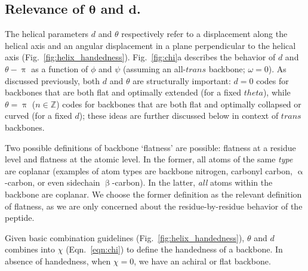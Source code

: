 \documentclass[fleqn,10pt]{wlpeerj} %
\newcommand{\Fig}[1]{Fig.~\ref{#1}}
\newcommand{\Eqn}[1]{Eqn.~\ref{#1}}
\newcommand\solidrule[1][1cm]{\rule[0.5ex]{#1}{0.2mm}}
\newcommand\dotdashedrule{\mbox{%
  \solidrule[1.5mm]\hspace{0.75mm}\solidrule[0.2mm]\hspace{0.75mm}\solidrule[1.5mm]}}
\newcommand\dashedrule{\mbox{%
  \solidrule[1.5mm]\hspace{0.75mm}\solidrule[1.5mm]}}
\newcommand{\figdir}{./figures}
\begin{document}
\subsection*{Relevance of $\bm \theta$ and $\bm d$.}
The helical parameters $d$ and $\theta$ respectively refer to a displacement along the helical axis and an angular displacement in a plane perpendicular to the helical axis (\Fig{fig:helix_handedness}).  \Fig{fig:chi}a describes the behavior of $d$ and $\theta-\uppi$ as a function of $\phi$ and $\psi$ (assuming an all-$trans$ backbone; $\omega=0$). 
As discussed previously, both $d$ and $\theta$ are structurally important: $d=0$ codes for backbones that are both flat and optimally extended (for a fixed $theta$), while $\theta=\uppi$ ($n\in\mathbb{Z}$) codes for backbones that are both flat and optimally collapsed or curved (for a fixed $d$); these ideas are further discussed below in context of $trans$ backbones. 

Two possible definitions of backbone `flatness' are possible: flatness at a residue level and flatness at the atomic level. In the former, all atoms of the same {\em type} are coplanar (examples of atom types are backbone nitrogen, carbonyl carbon, $\upalpha$-carbon, or even sidechain $\upbeta$-carbon). In the latter, {\em all} atoms within the backbone are coplanar. We choose the former definition as the relevant definition of flatness, as we are only concerned about the residue-by-residue behavior of the peptide. 

Given basic combination guidelines (\Fig{fig:helix_handedness}), $\theta$ and $d$ combines into $\chi$ (\Eqn{eqn:chi}) to define the handedness of a backbone. In absence of handedness, when $\chi=0$, we have an achiral or flat backbone. 

\begin{figure}[t!]
\end{figure}
\end{document}
